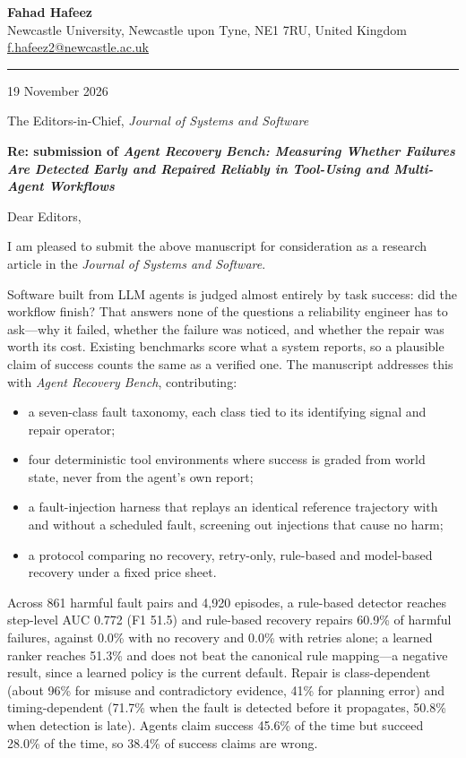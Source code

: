 \documentclass[11pt]{article}
\begin{document}
{\small\textbf{Fahad Hafeez}\\
Newcastle University, Newcastle upon Tyne, NE1 7RU, United Kingdom\\
\href{mailto:f.hafeez2@newcastle.ac.uk}{f.hafeez2@newcastle.ac.uk}}

\vspace{0.2em}
\hrule
\vspace{0.3em}

19 November 2026

The Editors-in-Chief, \emph{Journal of Systems and Software}

\textbf{Re: submission of \emph{Agent Recovery Bench: Measuring Whether Failures Are
Detected Early and Repaired Reliably in Tool-Using and Multi-Agent Workflows}}

Dear Editors,

I am pleased to submit the above manuscript for consideration as a research article in the
\emph{Journal of Systems and Software}.

Software built from LLM agents is judged almost entirely by task success: did the workflow
finish? That answers none of the questions a reliability engineer has to ask---why it failed,
whether the failure was noticed, and whether the repair was worth its cost. Existing
benchmarks score what a system reports, so a plausible claim of success counts the same as a
verified one. The manuscript addresses this with \emph{Agent Recovery Bench}, contributing:
\begin{itemize}
  \item a seven-class fault taxonomy, each class tied to its identifying signal and repair
        operator;
  \item four deterministic tool environments where success is graded from world state, never
        from the agent's own report;
  \item a fault-injection harness that replays an identical reference trajectory with and
        without a scheduled fault, screening out injections that cause no harm;
  \item a protocol comparing no recovery, retry-only, rule-based and model-based recovery under
        a fixed price sheet.
\end{itemize}

Across 861 harmful fault pairs and 4,920 episodes, a rule-based detector reaches step-level AUC
0.772 (F1 51.5) and rule-based recovery repairs 60.9\% of harmful failures, against 0.0\% with
no recovery and 0.0\% with retries alone; a learned ranker reaches 51.3\% and does not beat the
canonical rule mapping---a negative result, since a learned policy is the current default.
Repair is class-dependent (about 96\% for misuse
and contradictory evidence, 41\% for planning error) and timing-dependent (71.7\% when the fault
is detected before it propagates, 50.8\% when detection is late). Agents claim success 45.6\% of
the time but succeed 28.0\% of the time, so 38.4\% of success claims are wrong.
\end{document}
